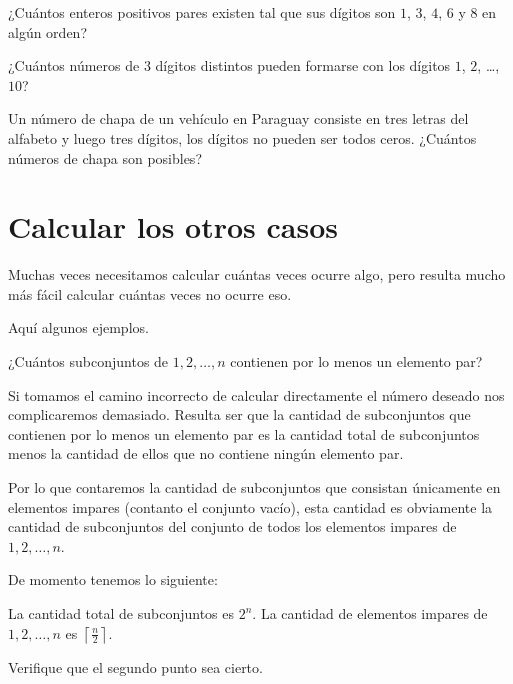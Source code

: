 \begin{problem}
¿Cuántos enteros positivos pares
existen tal que sus dígitos son
$1$, $3$, $4$, $6$ y $8$ en
algún orden?
\end{problem}

\begin{problem}
¿Cuántos números de $3$ dígitos
distintos pueden formarse con
los dígitos $1$, $2$, \dots, $10$?
\end{problem}

\begin{problem}
Un número de chapa de un vehículo
en Paraguay consiste en tres letras del
alfabeto y luego tres dígitos, los dígitos no
pueden ser todos ceros.
¿Cuántos números de chapa son posibles?
\end{problem}

\section{Calcular los otros casos} %
Muchas veces necesitamos calcular
cuántas veces ocurre algo, pero
resulta mucho más fácil calcular
cuántas veces no ocurre eso.

Aquí algunos ejemplos.

\begin{example}
	¿Cuántos subconjuntos de ${1, 2, \dots, n}$
	contienen por lo menos un elemento par?
\end{example}
Si tomamos el camino incorrecto de
calcular directamente el número
deseado nos complicaremos demasiado.
Resulta ser que la cantidad de subconjuntos
que contienen por lo menos un elemento
par es la cantidad total de subconjuntos
menos la cantidad de ellos que no contiene
ningún elemento par.

Por lo que contaremos la cantidad de subconjuntos
que consistan únicamente en
elementos impares (contanto el conjunto vacío),
esta cantidad es obviamente la cantidad de
subconjuntos del conjunto de todos los
elementos impares de ${1, 2, \dots, n}$.

De momento tenemos lo siguiente: %
\begin{itemize}
	\ii La cantidad total de subconjuntos es $2^n$.
	\ii La cantidad de elementos impares de ${1, 2, \dots, n}$
	es $\left\lceil\frac n2\right\rceil$.
\end{itemize}
\begin{question*}
	Verifique que el segundo punto sea cierto.
\end{question*}

